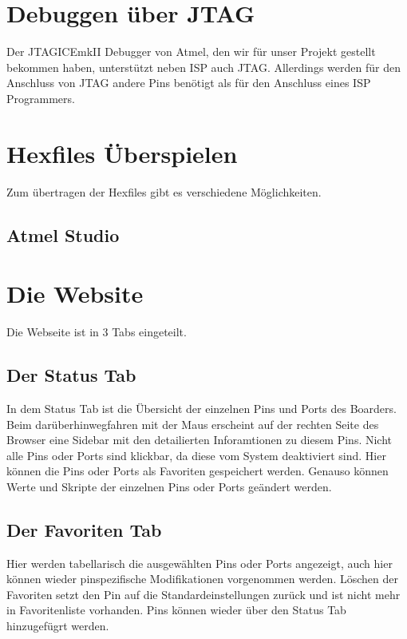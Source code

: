 \section{Debuggen über JTAG}

Der JTAGICEmkII Debugger von Atmel, den wir für unser Projekt gestellt bekommen
haben, unterstützt neben ISP auch JTAG. Allerdings werden für den Anschluss von
JTAG andere Pins benötigt als für den Anschluss eines ISP Programmers.


\section{Hexfiles Überspielen}

Zum übertragen der Hexfiles gibt es verschiedene Möglichkeiten.


\subsection{Atmel Studio}

\section{Die Website}

Die Webseite ist in 3 Tabs eingeteilt. 

\subsection{Der Status Tab}
In dem Status Tab ist die Übersicht der
einzelnen Pins und Ports des Boarders. Beim darüberhinwegfahren mit der
Maus erscheint auf der rechten Seite des Browser eine Sidebar mit den
detailierten Inforamtionen zu diesem Pins. Nicht alle Pins oder Ports sind
klickbar, da diese vom System deaktiviert sind. Hier können die Pins oder Ports
als Favoriten gespeichert werden. Genauso können Werte und Skripte der einzelnen
Pins oder Ports geändert werden.

\subsection{Der Favoriten Tab}
Hier werden tabellarisch die ausgewählten Pins oder Ports angezeigt, auch hier
können wieder pinspezifische Modifikationen vorgenommen werden. Löschen der
Favoriten setzt den Pin auf die Standardeinstellungen zurück und ist nicht mehr
in Favoritenliste vorhanden. Pins können wieder über den Status Tab hinzugefügrt
werden.


